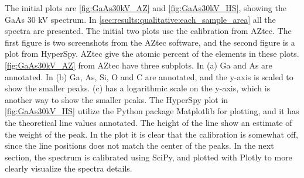 The initial plots are \cref{fig:GaAs30kV_AZ} and \cref{fig:GaAs30kV_HS}, showing the GaAs 30 kV spectrum.
In \cref{sec:results:qualitative:each_sample_area} all the spectra are presented.
The initial two plots use the calibration from AZtec.
The first figure is two screenshots from the AZtec software, and the second figure is a plot from HyperSpy.
AZtec give the atomic percent of the elements in these plots.
\cref{fig:GaAs30kV_AZ} from AZtec have three subplots.
In (a) Ga and As are annotated.
In (b) Ga, As, Si, O and C are annotated, and the y-axis is scaled to show the smaller peaks.
(c) has a logarithmic scale on the y-axis, which is another way to show the smaller peaks.
The HyperSpy plot in \cref{fig:GaAs30kV_HS} utilize the Python package Matplotlib for plotting, and it has the theoretical line values annotated.
The height of the line show an estimate of the weight of the peak.
In the plot it is clear that the calibration is somewhat off, since the line positions does not match the center of the peaks.
In the next section, the spectrum is calibrated using SciPy, and plotted with Plotly to more clearly visualize the spectra details.

